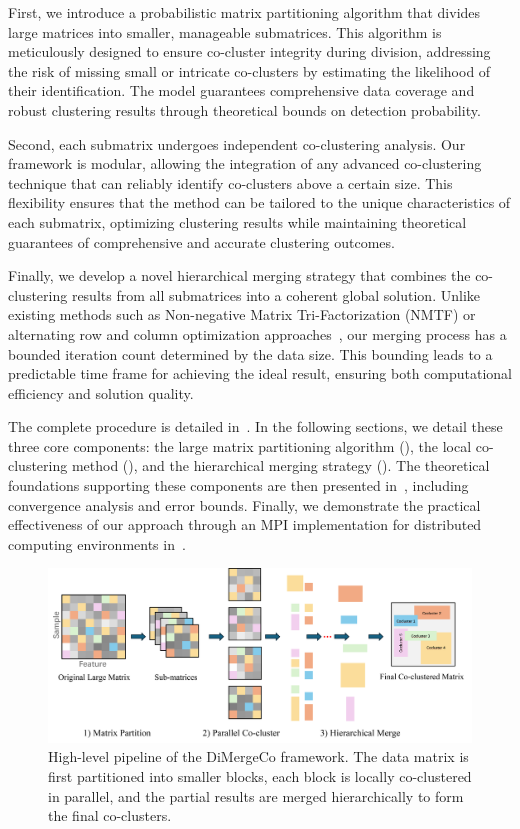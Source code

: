 \documentclass[journal]{IEEEtran}
\renewcommand{\cite}[1]{~\autocite{#1}}
\begin{document}
First, we introduce a probabilistic matrix partitioning algorithm that divides large matrices into smaller, manageable submatrices. This algorithm is meticulously designed to ensure co-cluster integrity during division, addressing the risk of missing small or intricate co-clusters by estimating the likelihood of their identification. The model guarantees comprehensive data coverage and robust clustering results through theoretical bounds on detection probability.

Second, each submatrix undergoes independent co-clustering analysis. Our framework is modular, allowing the integration of any advanced co-clustering technique that can reliably identify co-clusters above a certain size. This flexibility ensures that the method can be tailored to the unique characteristics of each submatrix, optimizing clustering results while maintaining theoretical guarantees of comprehensive and accurate clustering outcomes.

Finally, we develop a novel hierarchical merging strategy that combines the co-clustering results from all submatrices into a coherent global solution. Unlike existing methods such as Non-negative Matrix Tri-Factorization (NMTF) or alternating row and column optimization approaches\cite{wang2011FastNonnegativeMatrix}, our merging process has a bounded iteration count determined by the data size. This bounding leads to a predictable time frame for achieving the ideal result, ensuring both computational efficiency and solution quality.

The complete procedure is detailed in~. In the following sections, we detail these three core components: the large matrix partitioning algorithm (), the local co-clustering method (), and the hierarchical merging strategy (). The theoretical foundations supporting these components are then presented in~, including convergence analysis and error bounds. Finally, we demonstrate the practical effectiveness of our approach through an MPI implementation for distributed computing environments in~.

\begin{figure}[t]
    \centering
    \includegraphics[width=0.8\linewidth]{workflow.png} %
    \caption{High-level pipeline of the DiMergeCo framework. The data matrix is first partitioned into smaller blocks, each block is locally co-clustered in parallel, and the partial results are merged hierarchically to form the final co-clusters.}
    \label{fig:DiMergeCo_pipeline}
\end{figure}
\end{document}
